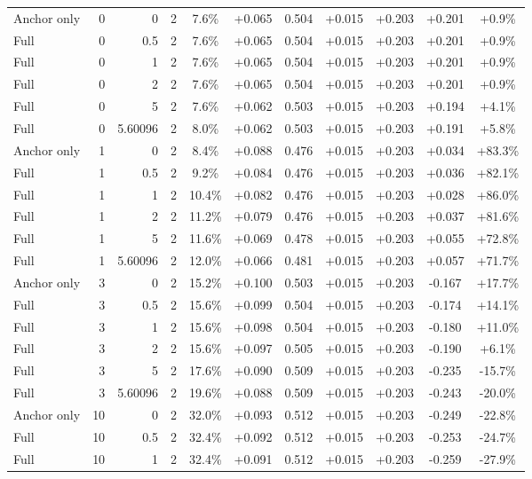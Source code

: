 \begin{table}[htbp]
\begin{tabular}{lrrrccccccc}
Anchor only & 0 & 0 & 2 & 7.6\% & +0.065 & 0.504 & +0.015 & +0.203 & +0.201 & +0.9\% \\
Full & 0 & 0.5 & 2 & 7.6\% & +0.065 & 0.504 & +0.015 & +0.203 & +0.201 & +0.9\% \\
Full & 0 & 1 & 2 & 7.6\% & +0.065 & 0.504 & +0.015 & +0.203 & +0.201 & +0.9\% \\
Full & 0 & 2 & 2 & 7.6\% & +0.065 & 0.504 & +0.015 & +0.203 & +0.201 & +0.9\% \\
Full & 0 & 5 & 2 & 7.6\% & +0.062 & 0.503 & +0.015 & +0.203 & +0.194 & +4.1\% \\
Full & 0 & 5.60096 & 2 & 8.0\% & +0.062 & 0.503 & +0.015 & +0.203 & +0.191 & +5.8\% \\
Anchor only & 1 & 0 & 2 & 8.4\% & +0.088 & 0.476 & +0.015 & +0.203 & +0.034 & +83.3\% \\
Full & 1 & 0.5 & 2 & 9.2\% & +0.084 & 0.476 & +0.015 & +0.203 & +0.036 & +82.1\% \\
Full & 1 & 1 & 2 & 10.4\% & +0.082 & 0.476 & +0.015 & +0.203 & +0.028 & +86.0\% \\
Full & 1 & 2 & 2 & 11.2\% & +0.079 & 0.476 & +0.015 & +0.203 & +0.037 & +81.6\% \\
Full & 1 & 5 & 2 & 11.6\% & +0.069 & 0.478 & +0.015 & +0.203 & +0.055 & +72.8\% \\
Full & 1 & 5.60096 & 2 & 12.0\% & +0.066 & 0.481 & +0.015 & +0.203 & +0.057 & +71.7\% \\
Anchor only & 3 & 0 & 2 & 15.2\% & +0.100 & 0.503 & +0.015 & +0.203 & -0.167 & +17.7\% \\
Full & 3 & 0.5 & 2 & 15.6\% & +0.099 & 0.504 & +0.015 & +0.203 & -0.174 & +14.1\% \\
Full & 3 & 1 & 2 & 15.6\% & +0.098 & 0.504 & +0.015 & +0.203 & -0.180 & +11.0\% \\
Full & 3 & 2 & 2 & 15.6\% & +0.097 & 0.505 & +0.015 & +0.203 & -0.190 & +6.1\% \\
Full & 3 & 5 & 2 & 17.6\% & +0.090 & 0.509 & +0.015 & +0.203 & -0.235 & -15.7\% \\
Full & 3 & 5.60096 & 2 & 19.6\% & +0.088 & 0.509 & +0.015 & +0.203 & -0.243 & -20.0\% \\
Anchor only & 10 & 0 & 2 & 32.0\% & +0.093 & 0.512 & +0.015 & +0.203 & -0.249 & -22.8\% \\
Full & 10 & 0.5 & 2 & 32.4\% & +0.092 & 0.512 & +0.015 & +0.203 & -0.253 & -24.7\% \\
Full & 10 & 1 & 2 & 32.4\% & +0.091 & 0.512 & +0.015 & +0.203 & -0.259 & -27.9\% \\

\end{tabular}
\end{table}
